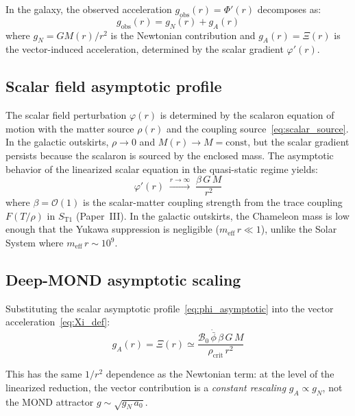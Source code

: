 \documentclass[aps,prd,twocolumn,superscriptaddress,nofootinbib]{revtex4-2}
\begin{document}
In the galaxy, the observed acceleration $g_{\mathrm{obs}}(r) = \Phi'(r)$ decomposes as:
\begin{equation}
g_{\mathrm{obs}}(r) = g_N(r) + g_A(r)
\label{eq:g_obs}
\end{equation}
where $g_N = GM(r)/r^2$ is the Newtonian contribution and $g_A(r) = \Xi(r)$ is the vector-induced acceleration, determined by the scalar gradient $\varphi'(r)$.

\subsection{Scalar field asymptotic profile}
\label{sec:scalar_asymptotic}

The scalar field perturbation $\varphi(r)$ is determined by the scalaron equation of motion with the matter source $\rho(r)$ and the coupling source~\eqref{eq:scalar_source}. In the galactic outskirts, $\rho \to 0$ and $M(r) \to M = \mathrm{const}$, but the scalar gradient persists because the scalaron is sourced by the enclosed mass. The asymptotic behavior of the linearized scalar equation in the quasi-static regime yields:
\begin{equation}
\varphi'(r) \;\xrightarrow{r \to \infty}\; \frac{\beta\,G\,M}{r^2}
\label{eq:phi_asymptotic}
\end{equation}
where $\beta = \mathcal{O}(1)$ is the scalar-matter coupling strength from the trace coupling $F(T/\rho)$ in $S_{\mathrm{T1}}$ (Paper~III). In the galactic outskirts, the Chameleon mass is low enough that the Yukawa suppression is negligible ($m_{\mathrm{eff}}\,r \ll 1$), unlike the Solar System where $m_{\mathrm{eff}}\,r \sim 10^{9}$.

\subsection{Deep-MOND asymptotic scaling}
\label{sec:deep_mond}

Substituting the scalar asymptotic profile~\eqref{eq:phi_asymptotic} into the vector acceleration~\eqref{eq:Xi_def}:
\begin{equation}
g_A(r) = \Xi(r) \simeq \frac{\mathcal{B}_0\,\dot{\bar{\phi}}\,\beta\,G\,M}{\rho_{\mathrm{crit}}\,r^2}
\label{eq:g_A_explicit}
\end{equation}

This has the same $1/r^2$ dependence as the Newtonian term: at the level of the linearized reduction, the vector contribution is a \textit{constant rescaling} $g_A \propto g_N$, not the MOND attractor $g \sim \sqrt{g_N\,a_0}$.
\end{document}
